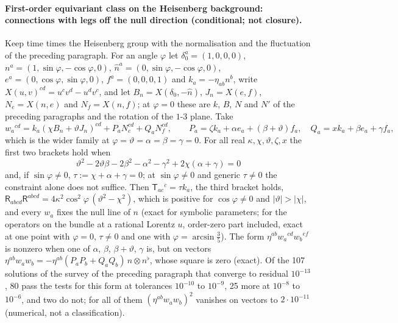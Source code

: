 \paragraph{First-order equivariant class on the Heisenberg background: connections with legs off the null direction (conditional; not closure).}
Keep time times the Heisenberg group with the normalisation and the fluctuation of the preceding paragraph. For an angle \(\varphi\) let \(\delta_0^a=(1,0,0,0)\), \(n^a=(1,\sin\varphi,-\cos\varphi,0)\), \(\hat n^a=(0,\sin\varphi,-\cos\varphi,0)\), \(e^a=(0,\cos\varphi,\sin\varphi,0)\), \(f^a=(0,0,0,1)\) and \(k_a=-\eta_{ab}n^b\), write \(X(u,v)^{cd}=u^cv^d-u^dv^c\), and let \(B_n=X(\delta_0,-\hat n)\), \(J_n=X(e,f)\), \(N_e=X(n,e)\) and \(N_f=X(n,f)\); at \(\varphi=0\) these are \(k\), \(B\), \(N\) and \(N'\) of the preceding paragraphs and the rotation of the \(1\)-\(3\) plane. Take
\[
w_a{}^{cd}=k_a(\chi B_n+\vartheta J_n)^{cd}+P_aN_e^{cd}+Q_aN_f^{cd},\qquad P_a=\zeta k_a+\alpha e_a+(\beta+\vartheta)f_a,\quad Q_a=xk_a+\beta e_a+\gamma f_a,
\]
which is the wider family at \(\varphi=\vartheta=\alpha=\beta=\gamma=0\). For all real \(\kappa,\chi,\vartheta,\zeta,x\) the first two brackets hold when
\[
\vartheta^2-2\vartheta\beta-2\beta^2-\alpha^2-\gamma^2+2\chi(\alpha+\gamma)=0
\]
and, if \(\sin\varphi\neq0\), \(\tau:=\chi+\alpha+\gamma=0\); at \(\sin\varphi\neq0\) and generic \(\tau\neq0\) the constraint alone does not suffice. Then \(\mathsf T_{ac}{}^c=\tau k_a\), the third bracket holds, \(\mathsf R_{abcd}\mathsf R^{abcd}=4\kappa^2\cos^2\varphi\,(\vartheta^2-\chi^2)\), which is positive for \(\cos\varphi\neq0\) and \(|\vartheta|>|\chi|\), and every \(w_a\) fixes the null line of \(n\) (exact for symbolic parameters; for the operators on the bundle at a rational Lorentz \(u\), order-zero part included, exact at one point with \(\varphi=0\), \(\tau\neq0\) and one with \(\varphi=\arcsin\tfrac35\)). The form \(\eta^{ab}w_a{}^{cd}w_b{}^{ef}\) is nonzero when one of \(\alpha\), \(\beta\), \(\beta+\vartheta\), \(\gamma\) is, but on vectors \(\eta^{ab}w_aw_b=-\eta^{ab}(P_aP_b+Q_aQ_b)\,n\otimes n^\flat\), whose square is zero (exact). Of the 107 solutions of the survey of the preceding paragraph that converge to residual \(10^{-13}\), 80 pass the tests for this form at tolerances \(10^{-10}\) to \(10^{-9}\), 25 more at \(10^{-8}\) to \(10^{-6}\), and two do not; for all of them \((\eta^{ab}w_aw_b)^2\) vanishes on vectors to \(2\cdot10^{-11}\) (numerical, not a classification).


